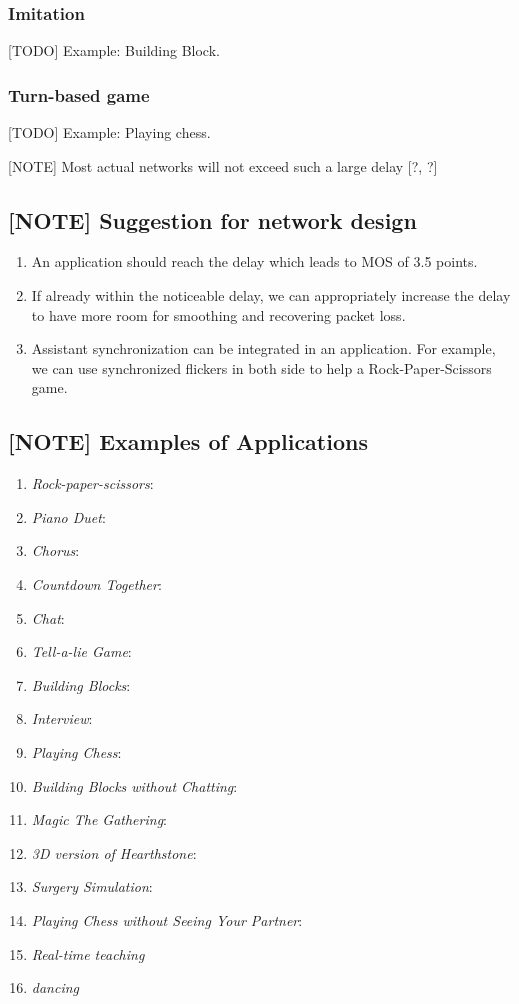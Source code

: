 \subsubsection{Imitation}

[TODO] Example: Building Block.

\subsubsection{Turn-based game}

[TODO] Example: Playing chess.

[NOTE] Most actual networks will not exceed such a large delay \cite{donovan2014understanding} [?, ?]

\subsection{[NOTE] Suggestion for network design}

\begin{enumerate}
    \item An application should reach the delay which leads to MOS of 3.5 points.
    \item If already within the noticeable delay, we can appropriately increase the delay to have more room for smoothing and recovering packet loss.
    \item Assistant synchronization can be integrated in an application. For example, we can use synchronized flickers in both side to help a Rock-Paper-Scissors game.
\end{enumerate}

\subsection{[NOTE] Examples of Applications}

\begin{enumerate}
    \item \emph{Rock-paper-scissors}:
    \item \emph{Piano Duet}:
    \item \emph{Chorus}:
    \item \emph{Countdown Together}:
    \item \emph{Chat}:
    \item \emph{Tell-a-lie Game}:
    \item \emph{Building Blocks}:
    \item \emph{Interview}:
    \item \emph{Playing Chess}:
    \item \emph{Building Blocks without Chatting}:
    \item \emph{Magic The Gathering}:
    \item \emph{3D version of Hearthstone}:
    \item \emph{Surgery Simulation}:
    \item \emph{Playing Chess without Seeing Your Partner}:
    \item \emph{Real-time teaching}
    \item \emph{dancing}
\end{enumerate}

